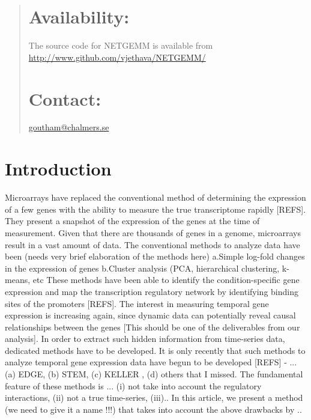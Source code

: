 \documentclass{bioinfo}
\begin{document}
\begin{abstract}
\section{Availability:}
The source code for NETGEMM is available from
\href{http://www.github.com/vjethava/NETGEMM/}{http://www.github.com/vjethava/NETGEMM/}

\section{Contact:} \href{goutham@chalmers.se}{goutham@chalmers.se}
\end{abstract}

\section{Introduction}

Microarrays have replaced the conventional method of determining the
expression of a few genes with the ability to measure the true
transcriptome rapidly [REFS]. They present a snapshot of the
expression of the genes at the time of measurement. Given that there
are thousands of genes in a genome, microarrays result in a vast
amount of data. The conventional methods to analyze data have been
(needs very brief elaboration of the methods here) a.Simple log-fold
changes in the expression of genes b.Cluster analysis (PCA,
hierarchical clustering, k-means, etc These methods have been able to
identify the condition-specific gene expression and map the
transcription regulatory network by identifying binding sites of the
promoters [REFS]. The interest in measuring temporal gene expression
is increasing again, since dynamic data can potentially reveal causal
relationships between the genes [This should be one of the
deliverables from our analysis]. In order to extract such hidden
information from time-series data, dedicated methods have to be
developed. It is only recently that such methods to analyze temporal
gene expression data have begun to be developed [REFS] - ...(a) EDGE,
(b) STEM, (c) KELLER , (d) others that I missed. The fundamental
feature of these methods is ... (i) not take into account the regulatory
interactions, (ii) not a true time-series, (iii)..  In this article,
we present a method (we need to give it a name !!!) that takes into
account the above drawbacks by ..
\end{document}
